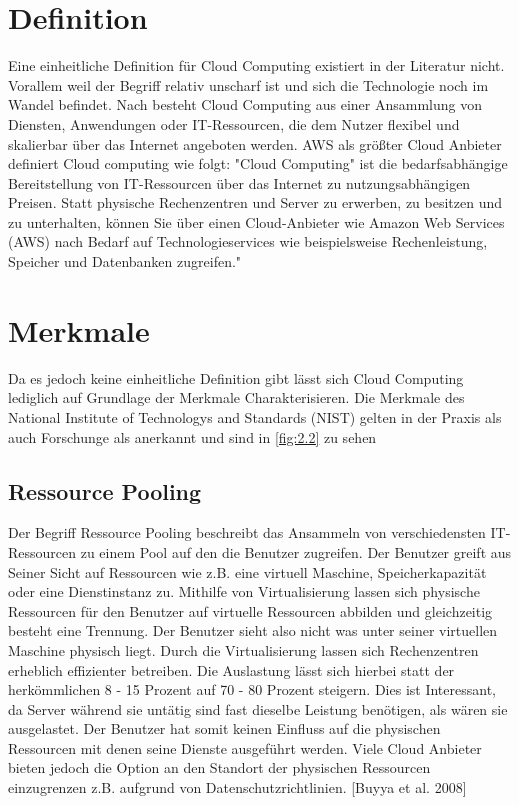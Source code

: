 \section{Definition}
Eine einheitliche Definition  für Cloud Computing existiert in der Literatur nicht. Vorallem weil der Begriff relativ unscharf ist und sich die Technologie noch im Wandel befindet. Nach besteht Cloud Computing aus einer Ansammlung von Diensten, Anwendungen oder IT-Ressourcen, die dem Nutzer flexibel und skalierbar über das Internet angeboten werden. AWS als größter Cloud Anbieter definiert Cloud computing wie folgt: "Cloud Computing" ist die bedarfsabhängige Bereitstellung von IT-Ressourcen über das Internet zu nutzungsabhängigen Preisen. Statt physische Rechenzentren und Server zu erwerben, zu besitzen und zu unterhalten, können Sie über einen Cloud-Anbieter wie Amazon Web Services (AWS) nach Bedarf auf Technologieservices wie beispielsweise Rechenleistung, Speicher und Datenbanken zugreifen."\cite*[]{AWSCC}

\section{Merkmale}
Da es jedoch keine einheitliche Definition gibt lässt sich Cloud Computing lediglich auf Grundlage der Merkmale Charakterisieren. Die Merkmale des National Institute of Technologys and Standards (NIST) gelten in der Praxis als auch Forschunge als anerkannt und sind in \autoref{fig:2.2} zu sehen
\subsection{Ressource Pooling}
Der Begriff Ressource Pooling beschreibt das Ansammeln von verschiedensten IT-Ressourcen zu einem Pool auf den die Benutzer zugreifen. Der Benutzer greift aus Seiner Sicht auf Ressourcen wie z.B. eine virtuell Maschine, Speicherkapazität oder eine Dienstinstanz zu. Mithilfe von Virtualisierung lassen sich physische Ressourcen für den Benutzer auf virtuelle Ressourcen abbilden und gleichzeitig besteht eine Trennung. Der Benutzer sieht also nicht was unter seiner virtuellen Maschine physisch liegt. Durch die Virtualisierung lassen sich Rechenzentren erheblich effizienter betreiben. Die Auslastung lässt sich hierbei statt der herkömmlichen 8 - 15 Prozent auf 70 - 80 Prozent steigern. Dies ist Interessant, da Server während sie untätig sind fast dieselbe Leistung benötigen, als wären sie ausgelastet\cite*[]{VMware}. Der Benutzer hat somit keinen Einfluss auf die physischen Ressourcen mit denen seine Dienste ausgeführt werden. Viele Cloud Anbieter bieten jedoch die Option an den Standort der physischen Ressourcen einzugrenzen z.B. aufgrund von Datenschutzrichtlinien.  [Buyya et al. 2008]%
